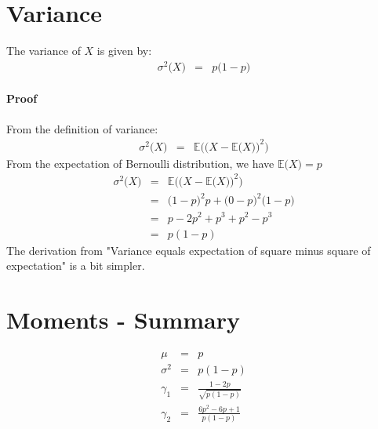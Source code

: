 \section{Variance}
The variance of $X$ is given by:
\begin{eqnarray}
	\sigma^{2}\big(X\big) &=& p\big(1 - p\big)
\end{eqnarray}

\paragraph{Proof}
From the definition of variance:
\begin{eqnarray}
	\nonumber
	\sigma^{2}\big(X\big) &=& \mathbb{E}\bigg(\Big(X - \mathbb{E}\big(X\big)\Big)^{2}\bigg)
\end{eqnarray}
From the expectation of Bernoulli distribution, we have $\mathbb{E}\big(X\big) = p$
\begin{eqnarray}
	\nonumber
	\sigma^{2}\big(X\big) &=& \mathbb{E}\bigg(\Big(X - \mathbb{E}\big(X\big)\Big)^{2}\bigg)\\
	\nonumber
	&=& \big(1 - p\big)^{2} p + \big(0 - p\big)^{2}\big(1 - p\big)\\
	\nonumber
	&=& p - 2p^{2} + p^{3} + p^{2} - p^{3}\\
	&=& p(1 - p)
\end{eqnarray}
The derivation from "Variance equals expectation of square minus square of expectation" is a bit simpler.


\section{Moments - Summary}
\begin{eqnarray}
	\mu &=& p\\
	\sigma^{2} &=& p(1 - p)\\
	\gamma_{1} &=& \frac{1 - 2p}{\sqrt{p(1 - p)}}\\
	\gamma_{2} &=& \frac{6p^{2} - 6p + 1}{p(1 - p)}
\end{eqnarray}
